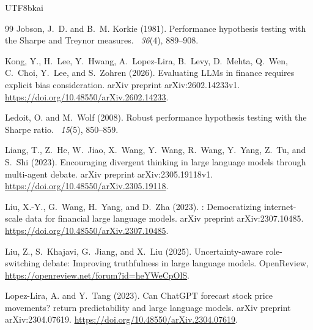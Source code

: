 \documentclass[12pt,a4paper]{article}
\begin{document}
\begin{CJK}{UTF8}{bkai}
\begin{thebibliography}{99}
Jobson, J.~D. and B.~M. Korkie (1981).
\newblock Performance hypothesis testing with the Sharpe and Treynor measures.
~{\em 36\/}(4), 889--908.

Kong, Y., H.~Lee, Y.~Hwang, A.~Lopez-Lira, B.~Levy, D.~Mehta, Q.~Wen, C.~Choi,
  Y.~Lee, and S.~Zohren (2026).
\newblock Evaluating {LLMs} in finance requires explicit bias consideration.
\newblock arXiv preprint arXiv:2602.14233v1.
\newblock \url{https://doi.org/10.48550/arXiv.2602.14233}.

Ledoit, O. and M.~Wolf (2008).
\newblock Robust performance hypothesis testing with the Sharpe ratio.
~{\em 15\/}(5), 850--859.

Liang, T., Z.~He, W.~Jiao, X.~Wang, Y.~Wang, R.~Wang, Y.~Yang, Z.~Tu, and
  S.~Shi (2023).
\newblock Encouraging divergent thinking in large language models through
  multi-agent debate.
\newblock arXiv preprint arXiv:2305.19118v1.
\newblock \url{https://doi.org/10.48550/arXiv.2305.19118}.

Liu, X.-Y., G.~Wang, H.~Yang, and D.~Zha (2023).
: Democratizing internet-scale data for financial large
  language models.
\newblock arXiv preprint arXiv:2307.10485.
\newblock \url{https://doi.org/10.48550/arXiv.2307.10485}.

Liu, Z., S.~Khajavi, G.~Jiang, and X.~Liu (2025).
\newblock Uncertainty-aware role-switching debate: Improving truthfulness in
  large language models.
\newblock OpenReview, \url{https://openreview.net/forum?id=heYWeCpOlS}.

Lopez-Lira, A. and Y.~Tang (2023).
\newblock Can {ChatGPT} forecast stock price movements? return predictability
  and large language models.
\newblock arXiv preprint arXiv:2304.07619.
\newblock \url{https://doi.org/10.48550/arXiv.2304.07619}.


\end{thebibliography}
\end{CJK}
\end{document}
